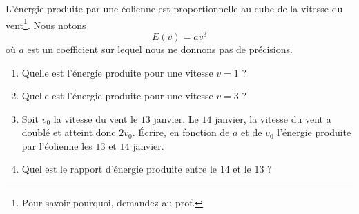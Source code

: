 
\begin{exercice}\label{exoSeconde-0068}

    L'énergie produite par une éolienne est proportionnelle au cube de la vitesse du vent\footnote{Pour savoir pourquoi, demandez au prof.}. Nous notons
    \begin{equation}
        E(v)=av^3
    \end{equation}
    où \( a\) est un coefficient sur lequel nous ne donnons pas de précisions. 
    \begin{enumerate}
        \item
            Quelle est l'énergie produite pour une vitesse \( v=1\) ?
        \item
            Quelle est l'énergie produite pour une vitesse \( v=3\) ?
        \item
            Soit \( v_0\) la vitesse du vent le \( 13\) janvier. Le \( 14\) janvier, la vitesse du vent a doublé et atteint donc \( 2v_0\). Écrire, en fonction de \( a\) et de \( v_0\) l'énergie produite par l'éolienne les \( 13\) et \( 14\) janvier.
        \item
            Quel est le rapport d'énergie produite entre le \( 14\) et le \( 13\) ?

    \end{enumerate}

\end{exercice}
